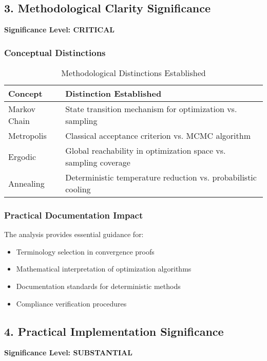 \documentclass[11pt,a4paper]{article}
\begin{document}
\subsection{3. Methodological Clarity Significance}

\textbf{Significance Level: \textcolor{high}{CRITICAL}}

\subsubsection{Conceptual Distinctions}
\begin{table}[H]
\centering
\caption{Methodological Distinctions Established}
\label{tab:methodological_distinctions}
\begin{tabular}{@{}lp{8cm}@{}}
\toprule
\textbf{Concept} & \textbf{Distinction Established} \\
\midrule
Markov Chain & State transition mechanism for optimization vs. sampling \\
Metropolis & Classical acceptance criterion vs. MCMC algorithm \\
Ergodic & Global reachability in optimization space vs. sampling coverage \\
Annealing & Deterministic temperature reduction vs. probabilistic cooling \\
\bottomrule
\end{tabular}
\end{table}

\subsubsection{Practical Documentation Impact}
The analysis provides essential guidance for:
\begin{itemize}
\item Terminology selection in convergence proofs
\item Mathematical interpretation of optimization algorithms
\item Documentation standards for deterministic methods
\item Compliance verification procedures
\end{itemize}

\subsection{4. Practical Implementation Significance}

\textbf{Significance Level: \textcolor{high}{SUBSTANTIAL}}
\end{document}
